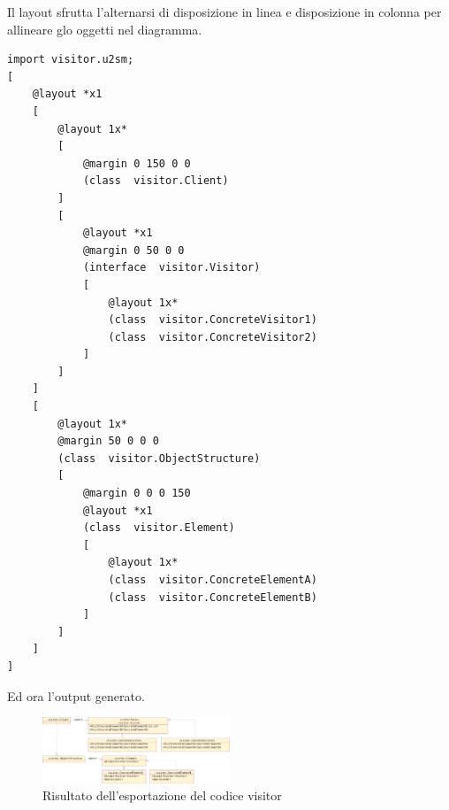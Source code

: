 Il layout sfrutta l'alternarsi di disposizione in linea e disposizione in
colonna per allineare glo oggetti nel diagramma.

\begin{lstlisting}[language=layout, caption={Il Layout}]
import visitor.u2sm;
[	
	@layout *x1
	[
		@layout 1x*
		[
			@margin 0 150 0 0
			(class	visitor.Client)
		]
		[
			@layout *x1
			@margin 0 50 0 0
			(interface	visitor.Visitor)
			[
				@layout 1x*
				(class	visitor.ConcreteVisitor1)
				(class	visitor.ConcreteVisitor2)
			]
		]
	]
	[
		@layout 1x*
		@margin 50 0 0 0
		(class	visitor.ObjectStructure)
		[
			@margin 0 0 0 150
			@layout *x1
			(class	visitor.Element)
			[
				@layout 1x*
				(class	visitor.ConcreteElementA)
				(class	visitor.ConcreteElementB)
			]
		]
	]
]
\end{lstlisting}

Ed ora l'output generato.

\begin{figure}[htp]
\begin{center}
  \includegraphics[angle=90,width=0.5\textwidth]{img/visitor}
  \caption[labelInTOC]{Risultato dell'esportazione del codice visitor}
\end{center}
\end{figure}



